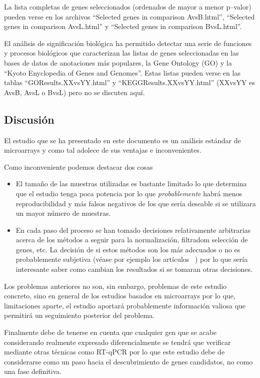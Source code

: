 \documentclass[a4paper]{article}\usepackage[]{graphicx}\usepackage[]{color}
\begin{document}
La lista completas de genes seleccionados (ordenados de mayor a menor p--valor) pueden verse en los archivos ``Selected genes in comparison AvsB.html'', ``Selected genes in comparison AvsL.html'' y ``Selected genes in comparison BvsL.html''.

El análisis de significación biológica ha permitido detectar una serie de funciones y procesos biológicos que caracterizan las listas de genes seleccionadas en las bases de datos de anotaciones más populares, la Gene Ontology (GO) y la ``Kyoto Enyclopedia of Genes and Genomes''. Estas listas pueden verse en las tablas ``GOResults.XXvsYY.html'' y ``KEGGResults.XXvsYY.html'' (XXvsYY es AvsB, AvsL o BvsL) pero no se discuten aquí.

\subsection{Discusión}

El estudio que se ha presentado en este documento es un análisis estándar de microarrays y como tal adolece de sus ventajas e inconvenientes.

Como inconveniente podemos destacar dos cosas
\begin{itemize}
\item El tamaño de las muestras utilizadas es bastante limitado lo que determina que el estudio tenga poca potencia por lo que \emph{probablemente} habrá menos reproducibilidad y más falsos negativos de los que sería deseable si se utilizara un mayor número de muestras.
\item En cada paso del proceso se han tomado decisiones relativamente arbitrarias acerca de los métodos a seguir para la normalización, filtradom selección de genes, etc. La decisión de si estos métodos son los más adecuados o no es probablemente subjetiva (véase por ejemplo los artículos ~\cite{Choe:2005, Zhu:2010}) por lo que sería interesante saber como cambian los resultados si se tomaran otras decisiones.
\end{itemize}

Los problemas anteriores no son, sin embargo, problemas de este estudio concreto, sino en general de los estudios basados en microarrays por lo que, limitaciones aparte, el estudio aportará probablemente información valiosa que permitirá un seguimiento posterior del problema.

Finalmente debe de tenerse en cuenta que cualquier gen que se acabe considerando realmente expresado diferencialmente se tendrá que verificar mediante otras técnicas como RT-qPCR por lo que este estudio debe de considerarse como un paso hacia el descubrimiento de genes candidatos, no como una fase definitiva.
\end{document}
